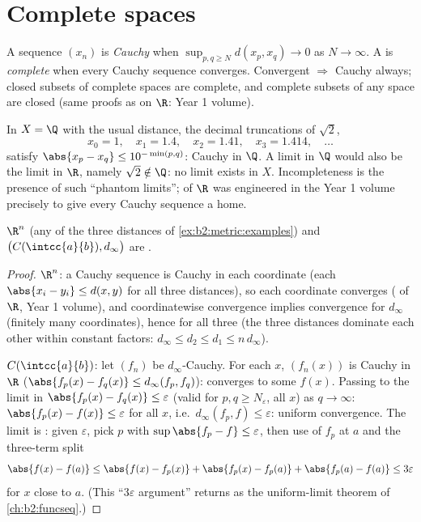 \section{Complete spaces}

\begin{definition}\label{def:b2:metric:complete}
A sequence $(x_n)$ is \emph{Cauchy} when $\sup_{p, q \geq N} d(x_p,
x_q) \to 0$ as $N \to \infty$. A  is
\emph{complete} when every Cauchy
sequence converges. Convergent $\Rightarrow$ Cauchy always; closed
subsets of complete spaces are complete, and complete subsets of any
space are closed (same proofs as on $\R$: Year 1 volume).
\end{definition}

\begin{example}\label{ex:b2:metric:cauchynolimit}
In $X = \Q$ with the usual distance, the decimal truncations of
$\sqrt2$,
\[
x_0 = 1,\quad x_1 = 1.4,\quad x_2 = 1.41,\quad x_3 = 1.414,
\quad\dots
\]
satisfy $\abs{x_p - x_q} \leq 10^{-\min(p,q)}$: Cauchy in $\Q$.
A limit in $\Q$ would also be the limit in $\R$, namely
$\sqrt2 \notin \Q$: no limit exists in $X$. Incompleteness is
the presence of such ``phantom limits'';  of $\R$
was engineered in the Year 1 volume precisely to give every
Cauchy sequence a home.
\end{example}

\begin{theorem}\label{thm:b2:metric:rncomplete}
$\R^n$ (any of the three distances of
\cref{ex:b2:metric:examples}) and $\bigl(C(\intcc{a}{b}),
d_\infty\bigr)$ are .
\end{theorem}

\begin{proof}
$\R^n$: a Cauchy sequence is Cauchy in each coordinate (each
$\abs{x_i - y_i} \leq d(x,y)$ for all three distances), so each
coordinate converges ( of $\R$, Year 1 volume), and
coordinatewise convergence implies convergence for $d_\infty$
(finitely many coordinates), hence for all three (the three
distances dominate each other within constant factors: $d_\infty
\leq d_2 \leq d_1 \leq n\,d_\infty$).

$C(\intcc{a}{b})$: let $(f_n)$ be $d_\infty$-Cauchy. For each $x$,
$(f_n(x))$ is Cauchy in $\R$ ($\abs{f_p(x) - f_q(x)} \leq
d_\infty(f_p, f_q)$): converges to some $f(x)$. Passing to the
limit in $\abs{f_p(x) - f_q(x)} \leq \varepsilon$ (valid for $p, q
\geq N_\varepsilon$, all $x$) as $q \to \infty$: $\abs{f_p(x) -
f(x)} \leq \varepsilon$ for all $x$, i.e.\ $d_\infty(f_p, f) \leq
\varepsilon$: uniform convergence. The limit is : given
$\varepsilon$, pick $p$ with $\sup\abs{f_p - f} \leq \varepsilon$,
then use  of $f_p$ at $a$ and the three-term split
\[
\abs{f(x) - f(a)} \leq \abs{f(x) - f_p(x)} + \abs{f_p(x) - f_p(a)}
+ \abs{f_p(a) - f(a)} \leq 3\varepsilon
\]
for $x$ close to $a$. (This ``$3\varepsilon$ argument'' returns as
the uniform-limit theorem of \cref{ch:b2:funcseq}.)
\end{proof}

